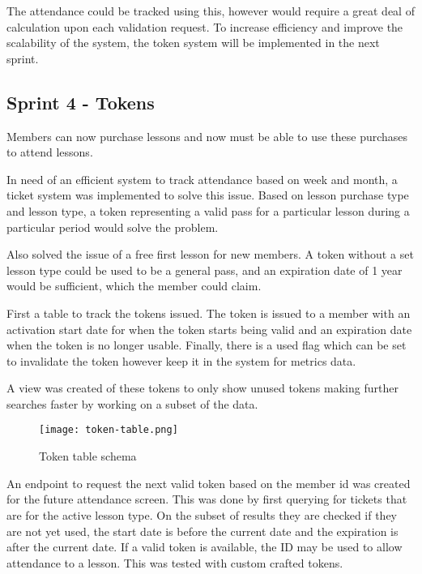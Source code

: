
The attendance could be tracked using this, however would require a great deal of calculation upon each validation request. To increase efficiency and improve the scalability of the system, the token system will be implemented in the next sprint.


\subsection{Sprint 4 - Tokens}
Members can now purchase lessons and now must be able to use these purchases to attend lessons.

In need of an efficient system to track attendance based on week and month, a ticket system was implemented to solve this issue. Based on lesson purchase type and lesson type, a token representing a valid pass for a particular lesson during a particular period would solve the problem.

Also solved the issue of a free first lesson for new members. A token without a set lesson type could be used to be a general pass, and an expiration date of 1 year would be sufficient, which the member could claim.

First a table to track the tokens issued. The token is issued to a member with an activation start date for when the token starts being valid and an expiration date when the token is no longer usable. Finally, there is a used flag which can be set to invalidate the token however keep it in the system for metrics data.

A view was created of these tokens to only show unused tokens making further searches faster by working on a subset of the data.

\begin{figure}[ht!]
    \centerline{\texttt{[image: token-table.png]}}
    \caption{Token table schema}
    \label{fig:token-table}
\end{figure}

An endpoint to request the next valid token based on the member id was created for the future attendance screen. This was done by first querying for tickets that are for the active lesson type. On the subset of results they are checked if they are not yet used, the start date is before the current date and the expiration is after the current date. If a valid token is available, the ID may be used to allow attendance to a lesson. This was tested with custom crafted tokens.

